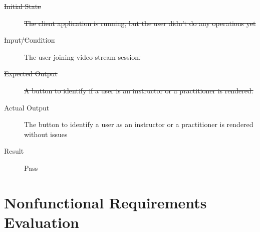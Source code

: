 \documentclass[12pt, titlepage]{article}
\begin{document}
\begin{enumerate}[FR-T1]
    \begin{description}
    \item[\sout{Initial State}]\sout{ The client application is running, but the user didn’t do
      any operations yet
    }
		\item[\sout{Input/Condition}]\sout{ The user joining video stream session.
    }
		\item[\sout{Expected Output}]\sout{ A button to identify if a user is an instructor or a
      practitioner is rendered.
    }
		\item[Actual Output] The button to identify a user as an instructor or a
      practitioner is rendered without issues
    \item[Result] Pass
    \end{description}
  \end{enumerate}

\section{Nonfunctional Requirements Evaluation}
\end{document}
